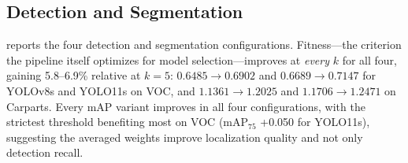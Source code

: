 \begin{table}[t]
  \centering \small
  \setlength{\tabcolsep}{3pt}\renewcommand{\arraystretch}{1.12}
  \caption{Equally weighted mean over the 30 classification configurations;
    change from the $k{=}1$ baseline in parentheses, in points.
    $^{\ddagger}$AUC averages the 24 configurations for which it was recorded
  (all but Tiny ImageNet).}
  \label{tab:aggregate}
\end{table}



\subsection{Detection and Segmentation}

 reports the four detection and segmentation
configurations. Fitness---the criterion the pipeline itself optimizes for model
selection---improves at \emph{every} $k$ for all four, gaining 5.8--6.9\%
relative at $k{=}5$: $0.6485\to0.6902$ and $0.6689\to0.7147$ for YOLOv8s and
YOLO11s on VOC, and $1.1361\to1.2025$ and $1.1706\to1.2471$ on Carparts. Every
mAP variant improves in all four configurations, with the strictest threshold
benefiting most on VOC (mAP$_{75}$ +0.050 for YOLO11s), suggesting the averaged
weights improve localization quality and not only detection recall.

